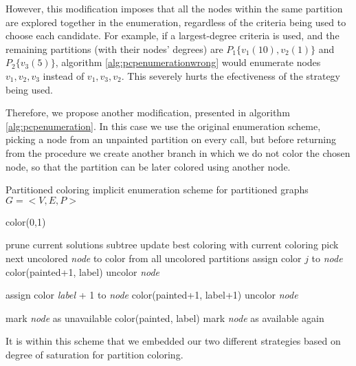 However, this modification imposes that all the nodes within the same partition are explored together in the enumeration, regardless of the criteria being used to choose each candidate. For example, if a largest-degree criteria is used, and the remaining partitions (with their nodes' degrees) are $P_1 \{v_1(10),v_2(1)\}$ and $P_2 \{v_3(5)\}$, algorithm \ref{alg:pcpenumerationwrong} would enumerate nodes $v_1, v_2, v_3$ instead of $v_1, v_3, v_2$. This severely hurts the efectiveness of the strategy being used.

Therefore, we propose another modification, presented in algorithm \ref{alg:pcpenumeration}. In this case we use the original enumeration scheme, picking a node from an unpainted partition on every call, but before returning from the procedure we create another branch in which we do not color the chosen node, so that the partition can be later colored using another node.

\begin{algorithm}
\caption{Partitioned coloring implicit enumeration scheme for partitioned graphs $G = <V,E,P>$}
\label{alg:pcpenumeration}

\begin{algorithmic}
\CALL color(0,1)

		\STATE prune current solutions subtree
		\STATE update best coloring with current coloring
	\ELSE
		\STATE pick next uncolored \textit{node} to color	from all uncolored partitions	
				\STATE assign color $j$ to \textit{node}
				\CALL color(painted+1, label)
				\STATE uncolor \textit{node}
			\ENDIF
		\ENDFOR
		
		\STATE assign color \textit{label} + 1 to \textit{node}
		\CALL color(painted+1, label+1)
		\STATE uncolor \textit{node}
		
			\STATE mark \textit{node} as unavailable
			\CALL color(painted, label)
			\STATE mark \textit{node} as available again
		\ENDIF
		
	\ENDIF
\ENDPROC

\end{algorithmic}
\end{algorithm}

It is within this scheme that we embedded our two different strategies based on degree of saturation for partition coloring.

